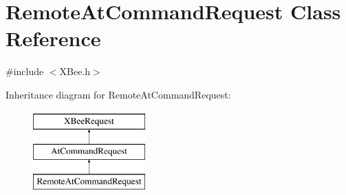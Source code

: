 \hypertarget{classRemoteAtCommandRequest}{\section{\-Remote\-At\-Command\-Request \-Class \-Reference}
\label{classRemoteAtCommandRequest}
}


{\ttfamily \#include $<$\-X\-Bee.\-h$>$}

\-Inheritance diagram for \-Remote\-At\-Command\-Request\-:\begin{figure}[H]
\begin{center}
\leavevmode
\includegraphics[height=3.000000cm]{classRemoteAtCommandRequest}
\end{center}
\end{figure}
